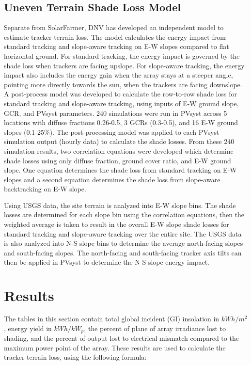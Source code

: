 \documentclass[conference]{IEEEtran}
\begin{document}
\subsection{Uneven Terrain Shade Loss Model}
Separate from SolarFarmer, DNV has developed an independent model to estimate tracker terrain loss. The model calculates the energy impact from standard tracking and slope-aware tracking on E-W slopes compared to flat horizontal ground. For standard tracking, the energy impact is governed by the shade loss when trackers are facing upslope. For slope-aware tracking, the energy impact also includes the energy gain when the array stays at a steeper angle, pointing more directly towards the sun, when the trackers are facing downslope. A post-process model was developed to calculate the row-to-row shade loss for standard tracking and slope-aware tracking, using inputs of E-W ground slope, GCR, and PVsyst parameters. 240 simulations were run in PVsyst across 5 locations with diffuse fractions 0.26-0.5, 3 GCRs (0.3-0.5), and 16 E-W ground slopes (0.1-25\%). The post-processing model was applied to each PVsyst simulation output (hourly data) to calculate the shade losses. From these 240 simulation results, two correlation equations were developed which determine shade losses using only diffuse fraction, ground cover ratio, and E-W ground slope. One equation determines the shade loss from standard tracking on E-W slopes and a second equation determines the shade loss from slope-aware backtracking on E-W slope. 

Using USGS data, the site terrain is analyzed into E-W slope bins. The shade losses are determined for each slope bin using the correlation equations, then the weighted average is taken to result in the overall E-W slope shade losses for standard tracking and slope-aware tracking over the entire site. The USGS data is also analyzed into N-S slope bins to determine the average north-facing slopes and south-facing slopes. The north-facing and south-facing tracker axis tilts can then be applied in PVsyst to determine the N-S slope energy impact.


\section{Results}

The tables in this section contain total global incident (GI) insolation in $kWh/m^2$, energy yield in $kWh/kW_p$, the percent of plane of array irradiance lost to shading, and the percent of output lost to electrical mismatch compared to the maximum power point of the array. These results are used to calculate the tracker terrain loss, using the following formula:
\end{document}
